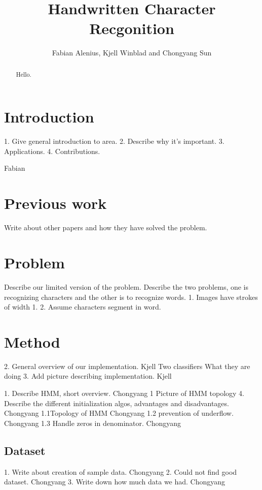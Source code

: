 \documentclass[11pt]{article}
\author{Fabian Alenius, Kjell Winblad and Chongyang Sun} \title{Handwritten Character Recgonition}
\begin{document}
\maketitle

\begin{abstract}
Hello.

\end{abstract}

\section{Introduction}
1. Give general introduction to area.
2. Describe why it's important.
3. Applications.
4. Contributions.

\cite{trec}
Fabian


\section{Previous work}
Write about other papers and how they have solved the problem.

\section{Problem}
Describe our limited version of the problem.
Describe the two problems, one is recognizing characters and the other is to recognize words.
1. Images have strokes of width 1.
2. Assume characters segment in word.

\section{Method}
2. General overview of our implementation.   Kjell
	Two classifiers
		What they are doing
3. Add picture describing implementation.  Kjell

1. Describe HMM, short overview. Chongyang
1 Picture of HMM topology
4. Describe the different initialization algos, advantages and disadvantages. Chongyang
1.1Topology of HMM Chongyang
1.2 prevention of underflow. Chongyang
1.3 Handle zeros in denominator. Chongyang 




\subsection{Dataset}\label{sec:dataset}
1. Write about creation of sample data. Chongyang
2. Could not find good dataset. Chongyang
3. Write down how much data we had. Chongyang
\end{document}
